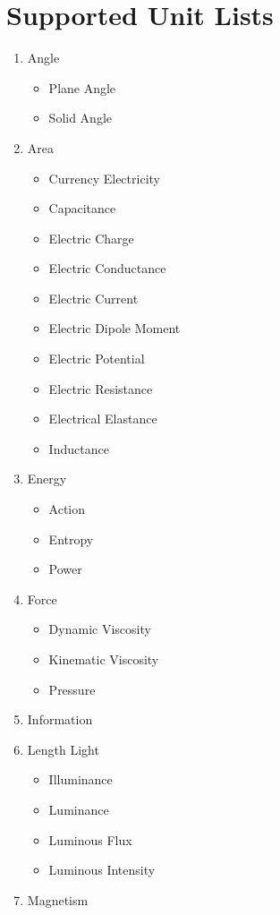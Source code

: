 \documentclass{article}
\begin{document}
	\section{Supported Unit Lists}
	\begin{enumerate}[label=\alph*) ]
		\item Angle
		\begin{itemize}
			\item Plane Angle
			\item Solid Angle
		\end{itemize}
		\item Area
		\begin{itemize}
			\item Currency Electricity
			\item Capacitance
			\item Electric Charge
			\item Electric Conductance
			\item Electric Current
			\item Electric Dipole Moment
			\item Electric Potential
			\item Electric Resistance
			\item Electrical Elastance
			\item Inductance
		\end{itemize}
		\item Energy
		\begin{itemize}
			\item Action
			\item Entropy
			\item Power
		\end{itemize}
		\item Force
		\begin{itemize}
			\item Dynamic Viscosity
			\item Kinematic Viscosity
			\item Pressure
		\end{itemize}
		\item Information
		\item Length Light
		\begin{itemize}
			\item Illuminance
			\item Luminance
			\item Luminous Flux
			\item Luminous Intensity
		\end{itemize}
		\item Magnetism

\end{enumerate}
\end{document}
